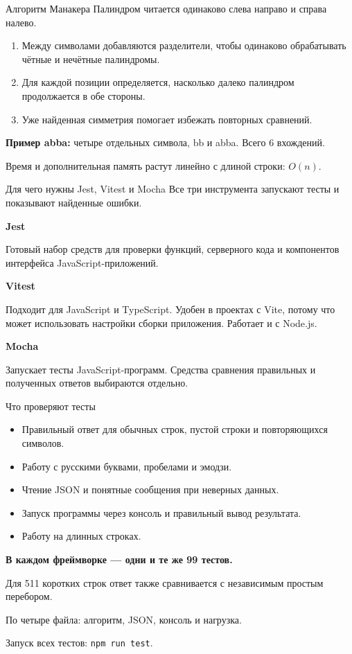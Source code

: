 \documentclass[aspectratio=169,11pt]{beamer}
\begin{document}
\begin{frame}{Алгоритм Манакера}
Палиндром читается одинаково слева направо и справа налево.
\begin{enumerate}
\item Между символами добавляются разделители, чтобы одинаково обрабатывать чётные и нечётные палиндромы.
\item Для каждой позиции определяется, насколько далеко палиндром продолжается в обе стороны.
\item Уже найденная симметрия помогает избежать повторных сравнений.
\end{enumerate}
\textbf{Пример abba:} четыре отдельных символа, bb и abba. Всего 6 вхождений.
\vspace{3mm}
\par Время и дополнительная память растут линейно с длиной строки: $O(n)$.
\end{frame}

\begin{frame}{Для чего нужны Jest, Vitest и Mocha}
Все три инструмента запускают тесты и показывают найденные ошибки.
\vspace{4mm}
\par\textbf{Jest}\par
Готовый набор средств для проверки функций, серверного кода и компонентов интерфейса JavaScript-приложений.
\vspace{4mm}
\par\textbf{Vitest}\par
Подходит для JavaScript и TypeScript. Удобен в проектах с Vite, потому что может использовать настройки сборки приложения. Работает и с Node.js.
\vspace{4mm}
\par\textbf{Mocha}\par
Запускает тесты JavaScript-программ. Средства сравнения правильных и полученных ответов выбираются отдельно.
\end{frame}

\begin{frame}{Что проверяют тесты}
\begin{itemize}
\item Правильный ответ для обычных строк, пустой строки и повторяющихся символов.
\item Работу с русскими буквами, пробелами и эмодзи.
\item Чтение JSON и понятные сообщения при неверных данных.
\item Запуск программы через консоль и правильный вывод результата.
\item Работу на длинных строках.
\end{itemize}
\vspace{3mm}
\textbf{В каждом фреймворке --- одни и те же 99 тестов.}\par
Для 511 коротких строк ответ также сравнивается с независимым простым перебором.\par
По четыре файла: алгоритм, JSON, консоль и нагрузка.\par
Запуск всех тестов: \texttt{npm run test}.
\end{frame}
\end{document}
